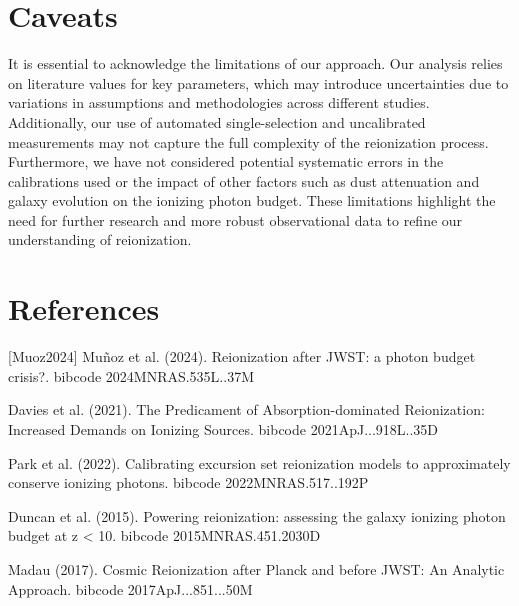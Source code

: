 \documentclass[twocolumn]{aastex631}
\begin{document}
\section{Caveats}
It is essential to acknowledge the limitations of our approach. Our analysis relies on literature values for key parameters, which may introduce uncertainties due to variations in assumptions and methodologies across different studies. Additionally, our use of automated single-selection and uncalibrated measurements may not capture the full complexity of the reionization process. Furthermore, we have not considered potential systematic errors in the calibrations used or the impact of other factors such as dust attenuation and galaxy evolution on the ionizing photon budget. These limitations highlight the need for further research and more robust observational data to refine our understanding of reionization.
\section*{References}
\footnotesize
[Muoz2024] Muñoz et al. (2024). Reionization after JWST: a photon budget crisis?. bibcode 2024MNRAS.535L..37M \par [Davies2021] Davies et al. (2021). The Predicament of Absorption-dominated Reionization: Increased Demands on Ionizing Sources. bibcode 2021ApJ...918L..35D \par [Park2022] Park et al. (2022). Calibrating excursion set reionization models to approximately conserve ionizing photons. bibcode 2022MNRAS.517..192P \par [Duncan2015] Duncan et al. (2015). Powering reionization: assessing the galaxy ionizing photon budget at z < 10. bibcode 2015MNRAS.451.2030D \par [Madau2017] Madau (2017). Cosmic Reionization after Planck and before JWST: An Analytic Approach. bibcode 2017ApJ...851...50M
\end{document}
